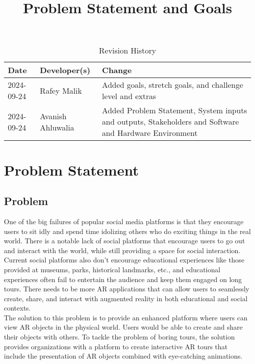 \documentclass{article}
\title{Problem Statement and Goals\\\progname}
\author{\authname}
\date{}
\begin{document}
\maketitle

\begin{table}[hp]
\caption{Revision History} \label{TblRevisionHistory}
\begin{tabularx}{\textwidth}{llX}
\toprule
\textbf{Date} & \textbf{Developer(s)} & \textbf{Change}\\
\midrule
2024-09-24 & Rafey Malik & Added goals, stretch goals, and challenge level and extras\\
2024-09-24 & Avanish Ahluwalia & Added Problem Statement, System inputs and outputs, Stakeholders and Software and Hardware Environment\\
\bottomrule
\end{tabularx}
\end{table}

\section{Problem Statement}

\subsection{Problem}
One of the big failures of popular social media platforms is that they encourage users to sit idly and spend time idolizing others who do exciting things in the real world. There is a notable lack of social platforms that encourage users to go out and interact with the world, while still providing a space for social interaction. Current social platforms also don’t encourage educational experiences like those provided at museums, parks, historical landmarks, etc., and educational experiences often fail to entertain the audience and keep them engaged on long tours. There needs to be more AR applications that can allow users to seamlessly create, share, and interact with augmented reality in both educational and social contexts.\\
The solution to this problem is to provide an enhanced platform where users can view AR objects in the physical world. Users would be able to create and share their objects with others. To tackle the problem of boring tours, the solution provides organizations with a platform to create interactive AR tours that include the presentation of AR objects combined with eye-catching animations.
\end{document}
